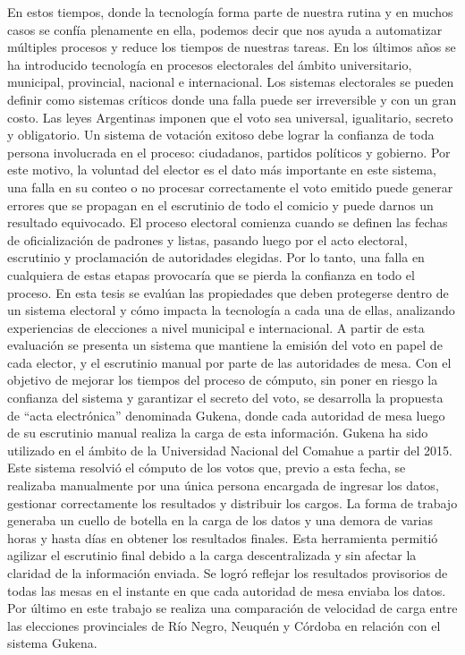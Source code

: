  En estos tiempos, donde la tecnología forma parte de nuestra rutina y en muchos casos se confía plenamente en ella, podemos decir que nos ayuda a automatizar múltiples procesos y reduce los tiempos de nuestras tareas. En los últimos años se ha introducido tecnología en procesos electorales del ámbito universitario, municipal, provincial, nacional e internacional. Los sistemas electorales se pueden definir como sistemas críticos donde una falla puede ser irreversible y con un gran costo. Las leyes Argentinas imponen que el voto sea universal, igualitario, secreto y obligatorio. Un sistema de votación exitoso debe lograr la confianza de toda persona involucrada en el proceso: ciudadanos, partidos políticos y gobierno. Por este motivo, la voluntad del elector es el dato más importante en este sistema, una falla en su conteo o no procesar correctamente el voto emitido puede generar errores que se propagan en el escrutinio de todo el comicio y puede darnos un resultado equivocado.\newline
 El proceso electoral comienza cuando se definen las fechas de oficialización de padrones y listas, pasando luego por el acto electoral, escrutinio y proclamación de autoridades elegidas. Por lo tanto, una falla en cualquiera de estas etapas provocaría que se pierda la confianza en todo el proceso.\newline
 En esta tesis se evalúan las propiedades que deben protegerse dentro de un sistema electoral y cómo impacta la tecnología a cada una de ellas, analizando experiencias de elecciones a nivel municipal e internacional. A partir de esta evaluación se presenta un sistema que mantiene la emisión del voto en papel de cada elector, y el escrutinio manual por parte de las autoridades de mesa. Con el objetivo de mejorar los tiempos del proceso de cómputo, sin poner en riesgo la confianza del sistema y garantizar el secreto del voto, se desarrolla la propuesta de ``acta electrónica'' denominada Gukena, donde cada autoridad de mesa luego de su escrutinio manual realiza la carga de esta información.\newline
 Gukena ha sido utilizado en el ámbito de la Universidad Nacional del Comahue a partir del 2015. Este sistema resolvió el cómputo de los votos que, previo a esta fecha, se realizaba manualmente por una única persona encargada de ingresar los datos, gestionar correctamente los resultados y distribuir los cargos. La forma de trabajo generaba un cuello de botella en la carga de los datos y una demora de varias horas y hasta días en obtener los resultados finales.\newline
 Esta herramienta permitió agilizar el escrutinio final debido a la carga descentralizada y sin afectar la claridad de la información enviada. Se logró reflejar los resultados provisorios de todas las mesas en el instante en que cada autoridad de mesa enviaba los datos. \newline
 Por último en este trabajo se realiza una comparación de velocidad de carga entre las elecciones provinciales de Río Negro, Neuquén y Córdoba en relación con el sistema Gukena. 

\vfill
\pagebreak
